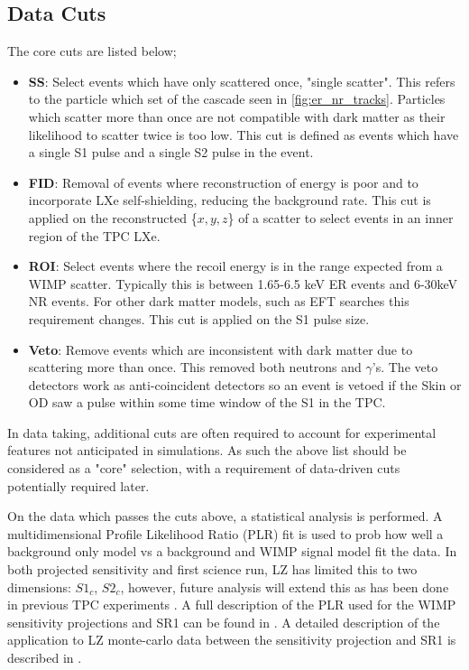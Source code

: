 \par
\subsection{Data Cuts}
\par
The core cuts are listed below;
\begin{itemize}
    \item \textbf{SS}: Select events which have only scattered once, "single scatter". This refers to the particle which set of the cascade seen in \autoref{fig:er_nr_tracks}. Particles which scatter more than once are not compatible with dark matter as their likelihood to scatter twice is too low. This cut is defined as events which have a single S1 pulse and a single S2 pulse in the event.
    \item \textbf{FID}: Removal of events where reconstruction of energy is poor and to incorporate LXe self-shielding, reducing the background rate. This cut is applied on the reconstructed \{$x,y,z$\} of a scatter to select events in an inner region of the TPC LXe.
    \item \textbf{ROI}: Select events where the recoil energy is in the range expected from a WIMP scatter. Typically this is between 1.65-6.5 keV ER events and 6-30keV NR events. For other dark matter models, such as EFT searches this requirement changes. This cut is applied on the S1 pulse size.
    \item \textbf{Veto}: Remove events which are inconsistent with dark matter due to scattering more than once. This removed both neutrons and $\gamma$'s. The veto detectors work as anti-coincident detectors so an event is vetoed if the Skin or OD saw a pulse within some time window of the S1 in the TPC.
\end{itemize}
In data taking, additional cuts are often required to account for experimental features not anticipated in simulations.
As such the above list should be considered as a "core" selection, with a requirement of data-driven cuts potentially required later.

\par
On the data which passes the cuts above, a statistical analysis is performed.
A multidimensional Profile Likelihood Ratio (PLR) fit is used to prob how well a background only model vs a background and WIMP signal model fit the data.
In both projected sensitivity and first science run, LZ has limited this to two dimensions: {$S1_c$, $S2_c$}, however, future analysis will extend this as has been done in previous TPC experiments \cite{LUX_RUN1_EFT_2021,LUX_RUN4_EFT_2021,shaunalsum_thesis_ref}.
A full description of the PLR used for the WIMP sensitivity projections and SR1 can be found in \cite{LZ_Ibles_LZStats_Thesis_ref}. 
A detailed description of the application to LZ monte-carlo data between the sensitivity projection and SR1 is described in \cite{jonathannikoleyczik_thesis_ref}.